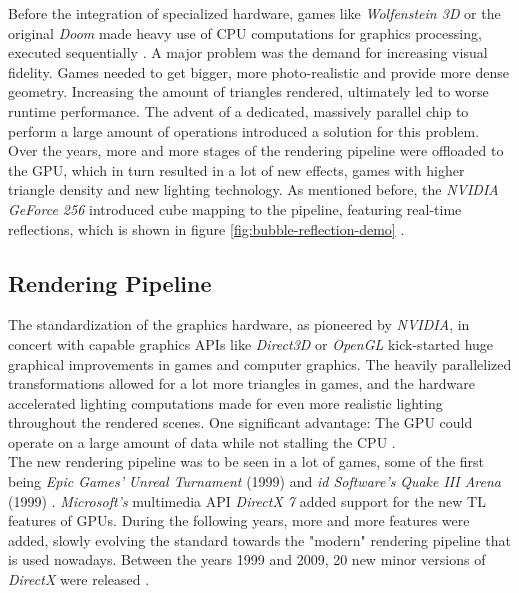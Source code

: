 \noindent
Before the integration of specialized hardware, games like \emph{Wolfenstein 3D} or the 
original \emph{Doom} made heavy use of \ac{CPU} computations for graphics processing, 
executed sequentially \cite{NVIDIA1999}. A major problem was the demand for increasing 
visual fidelity. Games needed to get bigger, more photo-realistic and provide more dense 
geometry. Increasing the amount of triangles rendered, ultimately led to worse runtime 
performance. The advent of a dedicated, massively parallel chip to perform a large amount of 
operations introduced a solution for this problem. Over the years, more and more stages of the 
rendering pipeline were offloaded to the \ac{GPU}, which in turn resulted in a lot of new effects, 
games with higher triangle density and new lighting technology. As mentioned before, the \emph{NVIDIA 
GeForce 256} introduced cube mapping to the pipeline, featuring real-time reflections, which is 
shown in figure \ref{fig:bubble-reflection-demo} \cite{Battaglia2024}.


\subsection*{Rendering Pipeline} \label{subsec-rendering-pipeline}

The standardization of the graphics hardware, as pioneered by \emph{NVIDIA}, in concert with capable 
graphics \ac{API}s like \emph{Direct3D} or \emph{OpenGL} kick-started huge graphical improvements in 
games and computer graphics. The heavily parallelized transformations allowed for a lot more triangles 
in games, and the hardware accelerated lighting computations made for even more realistic lighting 
throughout the rendered scenes. One significant advantage: The \ac{GPU} could operate on a large amount 
of data while not stalling the \ac{CPU} \cite{Fenno2024}.\\

\noindent
The new rendering pipeline was to be seen in a lot of games, some of the first being \emph{Epic Games'} 
\emph{Unreal Turnament} (1999) and \emph{id Software's} \emph{Quake III Arena} (1999) \cite{UnrealTurnament, 
Quake3Arena}. \emph{Microsoft's} multimedia \ac{API} \emph{DirectX 7} added support for the new \ac{TL} 
features of \ac{GPU}s. During the following years, more and more features were added, slowly evolving the 
standard towards the "modern" rendering pipeline that is used nowadays. Between the years 1999 and 2009,
20 new minor versions of \emph{DirectX} were released \cite{WikiDirectX}.


